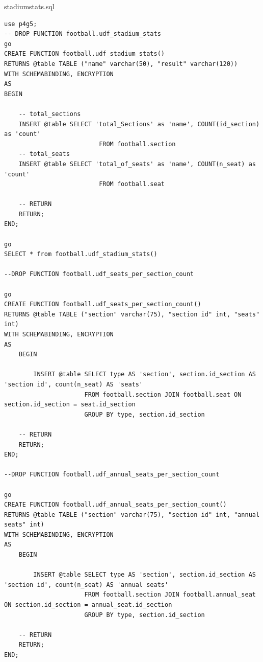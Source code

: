 \documentclass[pdftex,12pt,a4paper]{report}
\begin{document}
stadium{\textunderscore}stats.sql
\begin{lstlisting} 
use p4g5;
-- DROP FUNCTION football.udf_stadium_stats
go
CREATE FUNCTION football.udf_stadium_stats()
RETURNS @table TABLE ("name" varchar(50), "result" varchar(120))
WITH SCHEMABINDING, ENCRYPTION
AS
BEGIN
	
	-- total_sections
	INSERT @table SELECT 'total_Sections' as 'name', COUNT(id_section) as 'count'
						  FROM football.section
	-- total_seats
	INSERT @table SELECT 'total_of_seats' as 'name', COUNT(n_seat) as 'count'
						  FROM football.seat

	-- RETURN
	RETURN;
END;

go 
SELECT * from football.udf_stadium_stats()

--DROP FUNCTION football.udf_seats_per_section_count

go
CREATE FUNCTION football.udf_seats_per_section_count()
RETURNS @table TABLE ("section" varchar(75), "section id" int, "seats" int)
WITH SCHEMABINDING, ENCRYPTION
AS
	BEGIN

		INSERT @table SELECT type AS 'section', section.id_section AS 'section id', count(n_seat) AS 'seats' 
					  FROM football.section JOIN football.seat ON section.id_section = seat.id_section
					  GROUP BY type, section.id_section

	-- RETURN
	RETURN;
END;

--DROP FUNCTION football.udf_annual_seats_per_section_count

go
CREATE FUNCTION football.udf_annual_seats_per_section_count()
RETURNS @table TABLE ("section" varchar(75), "section id" int, "annual seats" int)
WITH SCHEMABINDING, ENCRYPTION
AS
	BEGIN

		INSERT @table SELECT type AS 'section', section.id_section AS 'section id', count(n_seat) AS 'annual seats' 
					  FROM football.section JOIN football.annual_seat ON section.id_section = annual_seat.id_section
					  GROUP BY type, section.id_section

	-- RETURN
	RETURN;
END;
\end{lstlisting}
\end{document}

